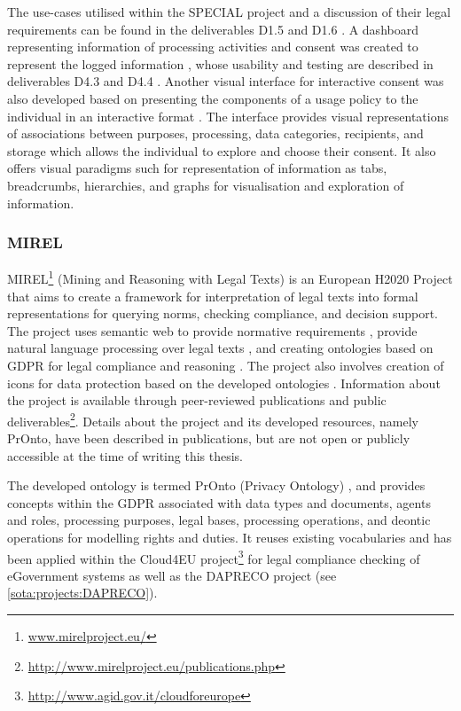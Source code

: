 The use-cases utilised within the SPECIAL project and a discussion of their legal requirements can be found in the deliverables D1.5 \cite{bonatti_d1.5_2018} and D1.6 \cite{schlehahn_d1.6_2018}. A dashboard representing information of processing activities and consent was created to represent the logged information \cite{raschke_designing_2017}, whose usability and testing are described in deliverables D4.3 \cite{raschke_d4.3_nodate} and D4.4 \cite{milosevic_d4.4_2019}. Another visual interface for interactive consent was also developed based on presenting the components of a usage policy to the individual in an interactive format \cite{gritzalis_i_2019}. The interface provides visual representations of associations between purposes, processing, data categories, recipients, and storage which allows the individual to explore and choose their consent. It also offers visual paradigms such for representation of information as tabs, breadcrumbs, hierarchies, and graphs for visualisation and exploration of information. 

\subsubsection{MIREL}\label{sota:projects:MIREL}
MIREL\footnote{\url{www.mirelproject.eu/}} (Mining and Reasoning with Legal Texts) is an European H2020 Project that aims to create a framework for interpretation of legal texts into formal representations for querying norms, checking compliance, and decision support. The project uses semantic web to provide normative requirements \cite{gandon_normative_2017}, provide natural language processing over legal texts \cite{milagro_teruel_legal_2018}, and creating ontologies based on GDPR \cite{monica_legal_2018} for legal compliance \cite{palmirani_pronto:_2018-1} and reasoning \cite{palmirani_pronto:_2018}. The project also involves creation of icons for data protection based on the developed ontologies \cite{arianna_dapis:_2019}.
Information about the project is available through peer-reviewed publications and public deliverables\footnote{\url{http://www.mirelproject.eu/publications.php}}.
Details about the project and its developed resources, namely PrOnto, have  been described in publications, but are not open or publicly accessible at the time of writing this thesis.

The developed ontology is termed PrOnto (Privacy Ontology) \cite{monica_legal_2018}, and provides concepts within the GDPR associated with data types and documents, agents and roles, processing purposes, legal bases, processing operations, and deontic operations for modelling rights and duties. It reuses existing vocabularies \cite{palmirani_pronto:_2018} and has been applied within the Cloud4EU project\footnote{\url{http://www.agid.gov.it/cloudforeurope}} for legal compliance checking of eGovernment systems as well as the DAPRECO project (see \autoref{sota:projects:DAPRECO}).

